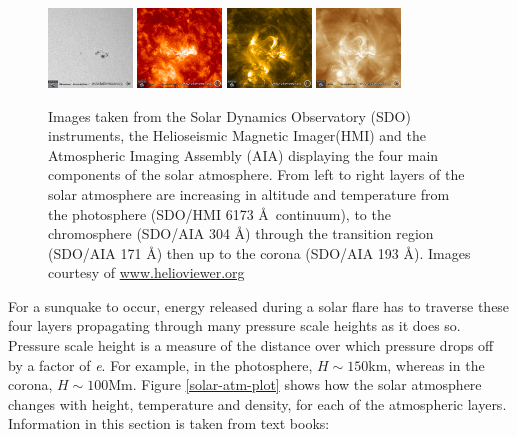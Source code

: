 \begin{figure}[H]%
  \begin{center}
  \includegraphics[width=0.20\textwidth]{2014_03_29_17_19_42_HMI_Int}%
  \includegraphics[width=0.20\textwidth]{2014_03_29_17_19_42_AIA_304}%
  \includegraphics[width=0.20\textwidth]{2014_03_29_17_19_42_AIA_171}%
  \includegraphics[width=0.20\textwidth]{2014_03_29_17_19_42_AIA_193}%
  \caption{ Images taken from the Solar Dynamics Observatory (SDO) instruments, the Helioseismic Magnetic Imager(HMI) and the Atmospheric Imaging Assembly (AIA) displaying the four main components of the solar atmosphere. From left to right layers of the solar atmosphere are increasing in altitude and temperature from the photosphere (SDO/HMI 6173 \AA\ continuum), to the chromosphere (SDO/AIA 304 \AA) through the transition region (SDO/AIA 171 \AA) then up to the corona (SDO/AIA 193 \AA). Images courtesy of \href{www.helioviewer.org}{www.helioviewer.org}}\label{solatmpics}
\end{center}
\end{figure}


For a sunquake to occur, energy released during a solar flare has to traverse these four layers propagating through many pressure scale heights as it does so. Pressure scale height is a measure of the distance over which pressure drops off by a factor of \emph{e}. For example, in the photosphere, $H\sim150$km, whereas in the corona, $H\sim100$Mm. Figure \ref{solar-atm-plot} shows how the solar atmosphere changes with height, temperature and density, for each of the atmospheric layers. Information in this section is taken from text books: \cite{2003dysu.book.....D, 2004soas.book.....F}


